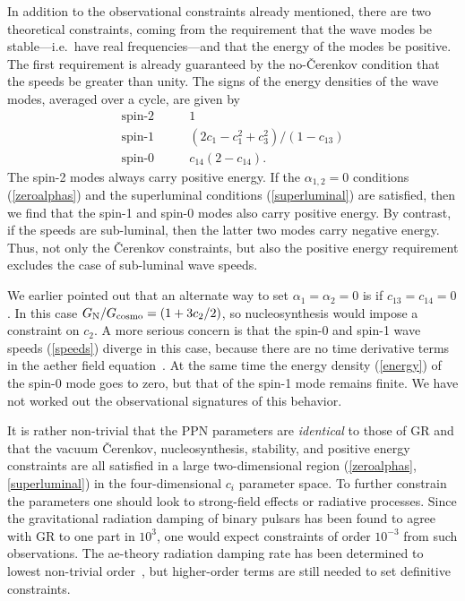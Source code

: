 \documentclass[aps,prd,preprint,amsmath,amssymb]{revtex4}
\def\beq{\begin{equation}}
\def\eeq{\end{equation}}
\def\a{\alpha}
\begin{document}
In addition to the observational constraints already mentioned,
there are two theoretical constraints, coming from the requirement
that the wave modes be stable---i.e.~have real frequencies---and
that the energy of the modes be positive. The first requirement is
already guaranteed by the no-\v{C}erenkov condition that the
speeds be greater than unity. The signs of the energy densities of
the wave modes, averaged over a cycle, are given
by~\cite{Eling:2005zq}
%
\beq\label{energy}
\begin{split}
    \mbox{spin-2}\qquad&1\\
    \mbox{spin-1}\qquad&(2c_1-c_1^2+c_3^2)/(1-c_{13}) \\
    \mbox{spin-0}\qquad&c_{14}(2-c_{14}).
\end{split}
\eeq
%
The spin-2 modes always carry positive energy. If the $\a_{1,2}=0$
conditions (\ref{zeroalphas}) and the superluminal conditions
(\ref{superluminal}) are satisfied, then we find that the spin-1
and spin-0 modes also carry positive energy. By contrast, if the
speeds are sub-luminal, then the latter two modes carry negative
energy. Thus, not only the \v{C}erenkov constraints, but also the
positive energy requirement excludes the case of sub-luminal wave
speeds.

We earlier pointed out that an alternate way to set $\a_1=\a_2=0$
is if $c_{13}=c_{14}=0$. In this case $G_{\rm N}/G_{\rm cosmo}=(1
+3c_2/2)$, so nucleosynthesis would impose a constraint on $c_2$.
A more serious concern is that the spin-0 and spin-1 wave speeds
(\ref{speeds}) diverge in this case, because there are no time
derivative terms in the aether field equation~\cite{JMwaves}.
At the same time the energy density (\ref{energy}) of the spin-0
mode goes to zero, but that of the spin-1 mode remains finite. We
have not worked out the observational signatures of this behavior.

It is rather non-trivial that the PPN parameters are {\it
identical} to those of GR and that the vacuum \v{C}erenkov,
nucleosynthesis, stability, and positive energy constraints are
all satisfied in a large two-dimensional region
(\ref{zeroalphas},\ref{superluminal}) in the four-dimensional
$c_i$ parameter space. To further constrain the parameters one
should look to strong-field effects or radiative processes. Since
the gravitational radiation damping of binary pulsars has been
found to agree with GR to one part in $10^3$, one would expect
constraints of order $10^{-3}$ from such observations. The
ae-theory radiation damping rate has been determined to lowest
non-trivial order~\cite{AERAD}, but higher-order terms
are still needed to set definitive constraints.  
\end{document}
